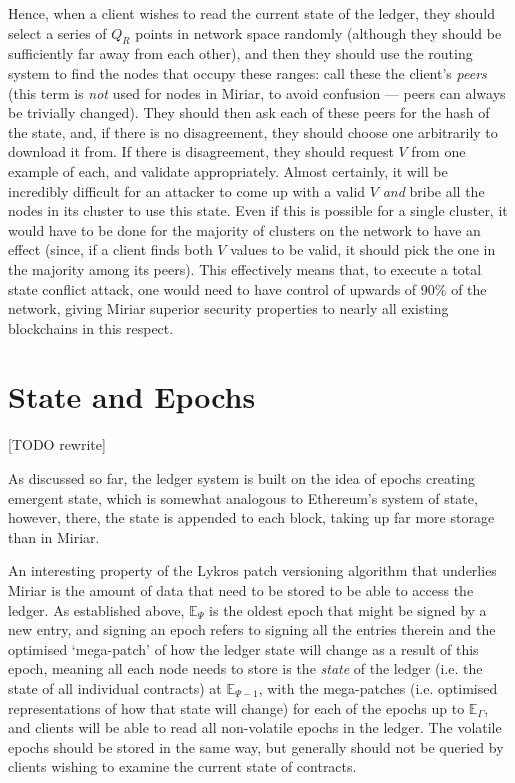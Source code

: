 \documentclass{extreport}
\begin{document}
Hence, when a client wishes to read the current state of the ledger, they should select a series of \(Q_R\) points in network space randomly (although they should be sufficiently far away from each other), and then they should use the routing system to find the nodes that occupy these ranges: call these the client's \emph{peers} (this term is \emph{not} used for nodes in Miriar, to avoid confusion --- peers can always be trivially changed). They should then ask each of these peers for the hash of the state, and, if there is no disagreement, they should choose one arbitrarily to download it from. If there is disagreement, they should request \(V\) from one example of each, and validate appropriately. Almost certainly, it will be incredibly difficult for an attacker to come up with a valid \(V\) \emph{and} bribe all the nodes in its cluster to use this state. Even if this is possible for a single cluster, it would have to be done for the majority of clusters on the network to have an effect (since, if a client finds both \(V\) values to be valid, it should pick the one in the majority among its peers). This effectively means that, to execute a total state conflict attack, one would need to have control of upwards of 90\% of the network, giving Miriar superior security properties to nearly all existing blockchains in this respect.

\section{State and Epochs}

[TODO rewrite]

As discussed so far, the ledger system is built on the idea of epochs creating emergent state, which is somewhat analogous to Ethereum's system of state, however, there, the state is appended to each block, taking up far more storage than in Miriar.

An interesting property of the Lykros patch versioning algorithm that underlies Miriar is the amount of data that need to be stored to be able to access the ledger. As established above, \(\mathbb{E}_\Psi\) is the oldest epoch that might be signed by a new entry, and signing an epoch refers to signing all the entries therein and the optimised `mega-patch' of how the ledger state will change as a result of this epoch, meaning all each node needs to store is the \emph{state} of the ledger (i.e. the state of all individual contracts) at \(\mathbb{E}_{\Psi - 1}\), with the mega-patches (i.e. optimised representations of how that state will change) for each of the epochs up to \(\mathbb{E}_\Gamma\), and clients will be able to read all non-volatile epochs in the ledger. The volatile epochs should be stored in the same way, but generally should not be queried by clients wishing to examine the current state of contracts.
\end{document}
